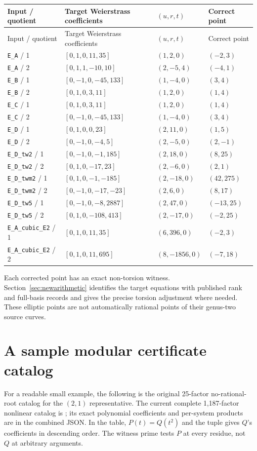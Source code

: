 \documentclass[11pt,letterpaper]{article}
\theoremstyle{definition}\newtheorem{definition}[theorem]{Definition}
\theoremstyle{remark}\newtheorem{remark}[theorem]{Remark}
\begin{document}
\begin{longtable}{l l l l}
\toprule
Input / quotient & Target Weierstrass coefficients & $(u,r,t)$ & Correct point\\
\midrule\endfirsthead
\toprule
Input / quotient & Target Weierstrass coefficients & $(u,r,t)$ & Correct point\\
\midrule\endhead
\texttt{E\_A} / 1 & $[0,1,0,11,35]$ & $(1,2,0)$ & $(-2,3)$ \\
\texttt{E\_A} / 2 & $[0,1,1,-10,10]$ & $(2,-5,4)$ & $(-4,1)$ \\
\texttt{E\_B} / 1 & $[0,-1,0,-45,133]$ & $(1,-4,0)$ & $(3,4)$ \\
\texttt{E\_B} / 2 & $[0,1,0,3,11]$ & $(1,2,0)$ & $(1,4)$ \\
\texttt{E\_C} / 1 & $[0,1,0,3,11]$ & $(1,2,0)$ & $(1,4)$ \\
\texttt{E\_C} / 2 & $[0,-1,0,-45,133]$ & $(1,-4,0)$ & $(3,4)$ \\
\texttt{E\_D} / 1 & $[0,1,0,0,23]$ & $(2,11,0)$ & $(1,5)$ \\
\texttt{E\_D} / 2 & $[0,-1,0,-4,5]$ & $(2,-5,0)$ & $(2,-1)$ \\
\texttt{E\_D\_tw2} / 1 & $[0,-1,0,-1,185]$ & $(2,18,0)$ & $(8,25)$ \\
\texttt{E\_D\_tw2} / 2 & $[0,1,0,-17,23]$ & $(2,-6,0)$ & $(2,1)$ \\
\texttt{E\_D\_twm2} / 1 & $[0,1,0,-1,-185]$ & $(2,-18,0)$ & $(42,275)$ \\
\texttt{E\_D\_twm2} / 2 & $[0,-1,0,-17,-23]$ & $(2,6,0)$ & $(8,17)$ \\
\texttt{E\_D\_tw5} / 1 & $[0,-1,0,-8,2887]$ & $(2,47,0)$ & $(-13,25)$ \\
\texttt{E\_D\_tw5} / 2 & $[0,1,0,-108,413]$ & $(2,-17,0)$ & $(-2,25)$ \\
\texttt{E\_A\_cubic\_E2} / 1 & $[0,1,0,11,35]$ & $(6,396,0)$ & $(-2,3)$ \\
\texttt{E\_A\_cubic\_E2} / 2 & $[0,1,0,11,695]$ & $(8,-1856,0)$ & $(-7,18)$ \\
\bottomrule
\end{longtable}
Each corrected point has an exact non-torsion witness. Section~\ref{sec:newarithmetic} identifies the target equations with published rank and full-basis records and gives the precise torsion adjustment where needed. These elliptic points are not automatically rational points of their genus-two source curves.

\section{A sample modular certificate catalog}\label{app:factors}
For a readable small example, the following is the original 25-factor no-rational-root catalog for the $(2,1)$ representative. The current complete 1,187-factor nonlinear catalog is ; its exact polynomial coefficients and per-system products are in the combined JSON. In the table, $P(t)=Q(t^2)$ and the tuple gives $Q$'s coefficients in descending order. The witness prime tests $P$ at every residue, not $Q$ at arbitrary arguments.
\end{document}
